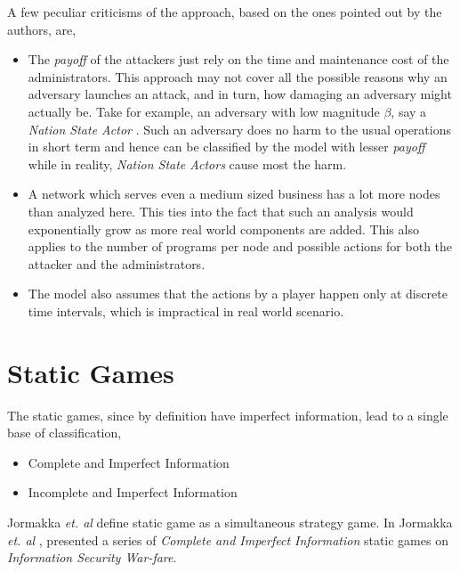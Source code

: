 \documentclass[conference]{IEEEtran}
\begin{document}
A few peculiar criticisms of the approach, based on the ones pointed out by the authors, are,
\begin{itemize}
	\item The \textit{payoff} of the attackers just rely on the time and maintenance cost of the administrators.
		This approach may not cover all the possible reasons why an adversary launches an attack, and in turn, how damaging an adversary might actually be.
                Take for example, an adversary with low magnitude $\beta$, say a \textit{Nation State Actor} \cite{cyberactor}.
		Such an adversary does no harm to the usual operations in short term and hence can be classified by the model with lesser \textit{payoff} while in reality, \textit{Nation State Actors} cause most the harm.
	\item A network which serves even a medium sized business has a lot more nodes than analyzed here.
		This ties into the fact that such an analysis would exponentially grow as more real world components are added.
		This also applies to the number of programs per node and possible actions for both the attacker and the administrators.
	\item The model also assumes that the actions by a player happen only at discrete time intervals, which is impractical in real world scenario.
\end{itemize}

\section*{Static Games}
The static games, since by definition have imperfect information, lead to a single base of classification,
\begin{itemize}
    \item Complete and Imperfect Information
    \item Incomplete and Imperfect Information
\end{itemize}
Jormakka \textit{et. al} \cite{static} define static game as a simultaneous strategy game.
In Jormakka \textit{et. al} \cite{static}, presented a series of \textit{Complete and Imperfect Information} static games on \textit{Information Security War-fare}.
\end{document}
